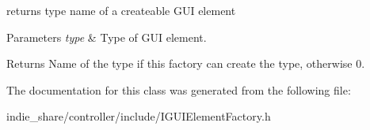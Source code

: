 returns type name of a createable G\+UI element 


\begin{DoxyParams}{Parameters}
{\em type} & Type of G\+UI element. \\
\hline
\end{DoxyParams}
\begin{DoxyReturn}{Returns}
Name of the type if this factory can create the type, otherwise 0. 
\end{DoxyReturn}


The documentation for this class was generated from the following file\+:\begin{DoxyCompactItemize}
\item 
indie\+\_\+share/controller/include/I\+G\+U\+I\+Element\+Factory.\+h\end{DoxyCompactItemize}
